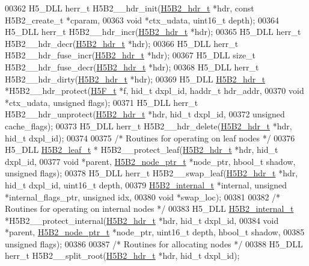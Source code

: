 \begin{DoxyCode}
{{00362 H5\_DLL herr\_t H5B2\_\_hdr\_init(\hyperlink{struct_h5_b2__hdr__t}{H5B2\_hdr\_t} *hdr, \textcolor{keyword}{const} H5B2\_create\_t *cparam,
00363     \textcolor{keywordtype}{void} *ctx\_udata, uint16\_t depth);
00364 H5\_DLL herr\_t H5B2\_\_hdr\_incr(\hyperlink{struct_h5_b2__hdr__t}{H5B2\_hdr\_t} *hdr);
00365 H5\_DLL herr\_t H5B2\_\_hdr\_decr(\hyperlink{struct_h5_b2__hdr__t}{H5B2\_hdr\_t} *hdr);
00366 H5\_DLL herr\_t H5B2\_\_hdr\_fuse\_incr(\hyperlink{struct_h5_b2__hdr__t}{H5B2\_hdr\_t} *hdr);
00367 H5\_DLL \textcolor{keywordtype}{size\_t} H5B2\_\_hdr\_fuse\_decr(\hyperlink{struct_h5_b2__hdr__t}{H5B2\_hdr\_t} *hdr);
00368 H5\_DLL herr\_t H5B2\_\_hdr\_dirty(\hyperlink{struct_h5_b2__hdr__t}{H5B2\_hdr\_t} *hdr);
00369 H5\_DLL \hyperlink{struct_h5_b2__hdr__t}{H5B2\_hdr\_t} *H5B2\_\_hdr\_protect(\hyperlink{struct_h5_f__t}{H5F\_t} *f, hid\_t dxpl\_id, haddr\_t hdr\_addr,
00370     \textcolor{keywordtype}{void} *ctx\_udata, \textcolor{keywordtype}{unsigned} flags);
00371 H5\_DLL herr\_t H5B2\_\_hdr\_unprotect(\hyperlink{struct_h5_b2__hdr__t}{H5B2\_hdr\_t} *hdr, hid\_t dxpl\_id,
00372     \textcolor{keywordtype}{unsigned} cache\_flags);
00373 H5\_DLL herr\_t H5B2\_\_hdr\_delete(\hyperlink{struct_h5_b2__hdr__t}{H5B2\_hdr\_t} *hdr, hid\_t dxpl\_id);
00374 
00375 \textcolor{comment}{/* Routines for operating on leaf nodes */}
00376 H5\_DLL \hyperlink{struct_h5_b2__leaf__t}{H5B2\_leaf\_t} * H5B2\_\_protect\_leaf(\hyperlink{struct_h5_b2__hdr__t}{H5B2\_hdr\_t} *hdr, hid\_t dxpl\_id,
00377     \textcolor{keywordtype}{void} *parent, \hyperlink{struct_h5_b2__node__ptr__t}{H5B2\_node\_ptr\_t} *node\_ptr, hbool\_t shadow, \textcolor{keywordtype}{unsigned} flags);
00378 H5\_DLL herr\_t H5B2\_\_swap\_leaf(\hyperlink{struct_h5_b2__hdr__t}{H5B2\_hdr\_t} *hdr, hid\_t dxpl\_id, uint16\_t depth,
00379     \hyperlink{struct_h5_b2__internal__t}{H5B2\_internal\_t} *\textcolor{keyword}{internal}, \textcolor{keywordtype}{unsigned} *internal\_flags\_ptr, \textcolor{keywordtype}{unsigned} idx,
00380     \textcolor{keywordtype}{void} *swap\_loc);
00381 
00382 \textcolor{comment}{/* Routines for operating on internal nodes */}
00383 H5\_DLL \hyperlink{struct_h5_b2__internal__t}{H5B2\_internal\_t} *H5B2\_\_protect\_internal(\hyperlink{struct_h5_b2__hdr__t}{H5B2\_hdr\_t} *hdr, hid\_t dxpl\_id,
00384     \textcolor{keywordtype}{void} *parent, \hyperlink{struct_h5_b2__node__ptr__t}{H5B2\_node\_ptr\_t} *node\_ptr, uint16\_t depth, hbool\_t shadow,
00385     \textcolor{keywordtype}{unsigned} flags);
00386 
00387 \textcolor{comment}{/* Routines for allocating nodes */}
00388 H5\_DLL herr\_t H5B2\_\_split\_root(\hyperlink{struct_h5_b2__hdr__t}{H5B2\_hdr\_t} *hdr, hid\_t dxpl\_id);
}}
\end{DoxyCode}
